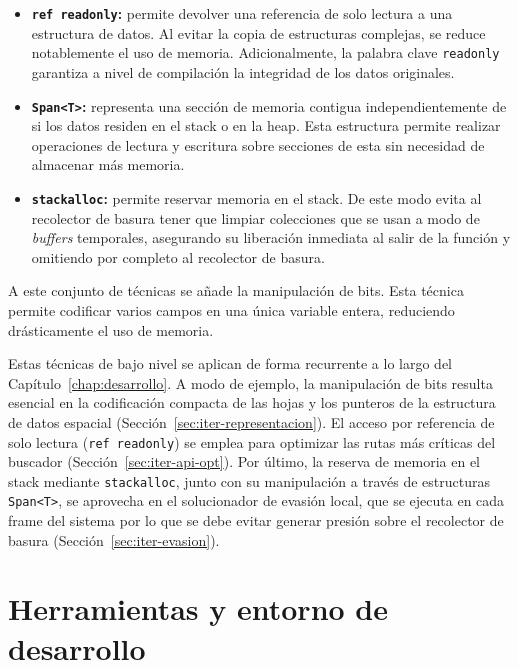 \begin{itemize}
    \item \textbf{\texttt{ref readonly}:} permite devolver una referencia de solo lectura a una estructura de datos.
    Al evitar la copia de estructuras complejas, se reduce notablemente el uso de memoria.
    Adicionalmente, la palabra clave \texttt{readonly} garantiza a nivel de compilación la integridad de los datos originales.
    \item \textbf{\texttt{Span\textless T\textgreater}:} representa una sección de memoria contigua independientemente de si los datos residen en el \gls{stack} o en la \gls{heap}.
    Esta estructura permite realizar operaciones de lectura y escritura sobre secciones de esta sin necesidad de almacenar más memoria.
    \item \textbf{\texttt{stackalloc}:} permite reservar memoria en el \gls{stack}.
    De este modo evita al recolector de basura tener que limpiar colecciones que se usan a modo de \textit{buffers} temporales, asegurando su liberación inmediata al salir de la función y omitiendo por completo al recolector de basura.
\end{itemize}

A este conjunto de técnicas se añade la manipulación de bits.
Esta técnica permite codificar varios campos en una única variable entera, reduciendo drásticamente el uso de memoria.

Estas técnicas de bajo nivel se aplican de forma recurrente a lo largo del Capítulo~\ref{chap:desarrollo}.
A modo de ejemplo, la manipulación de bits resulta esencial en la codificación compacta de las hojas y los punteros de la estructura de datos espacial (Sección~\ref{sec:iter-representacion}). El acceso por referencia de solo lectura (\texttt{ref readonly}) se emplea para optimizar las rutas más críticas del buscador (Sección~\ref{sec:iter-api-opt}).
Por último, la reserva de memoria en el \gls{stack} mediante \texttt{stackalloc}, junto con su manipulación a través de estructuras \texttt{Span\textless T\textgreater}, se aprovecha en el solucionador de evasión local, que se ejecuta en cada frame del sistema por lo que se debe evitar generar presión sobre el recolector de basura (Sección~\ref{sec:iter-evasion}).

\section{Herramientas y entorno de desarrollo}
\label{sec:herramientas}

